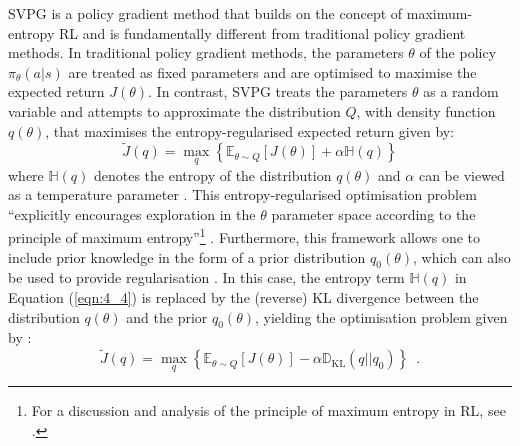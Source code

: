 SVPG is a policy gradient method that builds on the concept of maximum-entropy RL \citep{liu_svpg} and is fundamentally different from traditional policy gradient methods. In traditional policy gradient methods, the parameters $\theta$ of the policy $\pi_\theta(a|s)$ are treated as fixed parameters and are optimised to maximise the expected return $J(\theta)$. In contrast, SVPG treats the parameters $\theta$ as a random variable and attempts to approximate the distribution $Q$, with density function $q(\theta)$, that maximises the entropy-regularised expected return \citep{liu_svpg} given by:
\renewcommand{\theequation}{4.4}
\begin{equation}
\label{eqn:4_4}
\tilde{J}(q) = \underset{q}{\max} \left\{\mathbb{E}_{\theta \sim Q}\left[J(\theta)\right] + \alpha \mathbb{H}(q)\right\}
\end{equation}
where $\mathbb{H}(q)$ denotes the entropy of the distribution $q(\theta)$ and $\alpha$ can be viewed as a temperature parameter \citep{liu_svpg}. This entropy-regularised optimisation problem ``explicitly encourages exploration in the $\theta$ parameter space according to the principle of maximum entropy''\footnote{For a discussion and analysis of the principle of maximum entropy in RL, see \citet{levine_max_entropy}.} \citep{liu_svpg}. Furthermore, this framework allows one to include prior knowledge in the form of a prior distribution $q_0(\theta)$, which can also be used to provide regularisation \citep{liu_svpg}. In this case, the entropy term $\mathbb{H}(q)$ in Equation (\ref{eqn:4_4}) is replaced by the (reverse) KL divergence between the distribution $q(\theta)$ and the prior $q_0(\theta)$, yielding the optimisation problem given by \citet{liu_svpg}:
\renewcommand{\theequation}{4.5}
\begin{equation}
\tilde{J}(q) = \underset{q}{\max}\left\{\mathbb{E}_{\theta \sim Q}\left[J(\theta)\right] - \alpha \mathbb{D}_{\text{KL}}(q||q_0) \right\} \enspace.
\end{equation}

